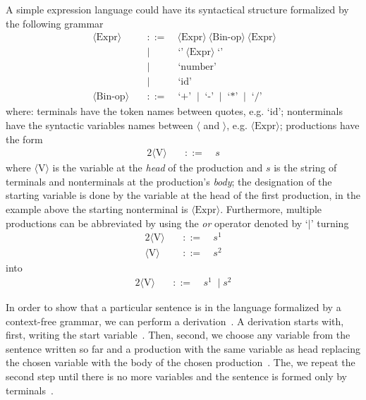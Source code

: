 \documentclass[
    oneside,
    english,
    coorientadorbanca,
    embeddedlogo,
    noabntexcite
]{ufsc-thesis-rn46-2019}
\newcommand{\bnfvar}[1]{\ \bnfvars{#1}}
\newcommand{\bnfvars}[1]{\langle\textrm{#1}\rangle}
\newcommand{\bnfter}[1]{\;\bnfters{#1}}
\newcommand{\bnfters}[1]{\textrm{`}\textrm{#1}\textrm{'}}
\newcommand{\bnfor}[1]{\;\mid{} #1}
\newcommand{\bnfprod}[2]{\bnfvars{#1} &\ &::= & #2}
\newcommand{\bnfmore}[1]{ && \mid{} & #1}
\begin{document}
A simple expression language could have its syntactical structure formalized by the following grammar
\begin{equation}~\label{eq:ambiguous_expr_grammar}
    \begin{alignedat}{2}
        \bnfprod{Expr}{\bnfvar{Expr} \bnfvar{Bin-op} \bnfvar{Expr}}  \\
        \bnfmore{\bnfter{}\bnfvar{Expr}\bnfter{}}                    \\
        \bnfmore{\bnfter{number}}                                    \\
        \bnfmore{\bnfter{id}}                                        \\
        \bnfprod{Bin-op}{\bnfter{+} \bnfor{\bnfter{-}} \bnfor{\bnfter{*}} \bnfor{\bnfter{/}}}
    \end{alignedat}
\end{equation}
where: terminals have the token names between quotes, e.g. $\bnfters{id}$;
nonterminals have the syntactic variables names between $\langle$ and $\rangle$, e.g. $\bnfvars{Expr}$;
productions have the form
\begin{alignat}{2}
    \bnfprod{V}{\ s} \nonumber
\end{alignat}
where $\bnfvars{V}$ is the variable at the \textit{head} of the production and $s$ is the string of terminals and nonterminals at the production's \textit{body};
the designation of the starting variable is done by the variable at the head of the first production, in the example above the starting nonterminal is $\bnfvars{Expr}$.
Furthermore, multiple productions can be abbreviated by using the \textit{or} operator denoted by `$\mid$' turning
\begin{alignat}{2}
    \bnfprod{V}{\ s^1} \nonumber \\
    \bnfprod{V}{\ s^2} \nonumber
\end{alignat}
into
\begin{alignat}{2}
    \bnfprod{V}{\ s^1 \bnfor{s^2}} \nonumber
\end{alignat}

In order to show that a particular sentence is in the language formalized by a context-free grammar, we can perform a derivation~\cite{sipser2012introduction}.
A derivation starts with, first, writing the start variable~\cite{sipser2012introduction}.
Then, second, we choose any variable from the sentence written so far and a production with the same variable as head replacing the chosen variable with the body of the chosen production~\cite{sipser2012introduction}.
The, we repeat the second step until there is no more variables and the sentence is formed only by terminals~\cite{sipser2012introduction}.
\end{document}
